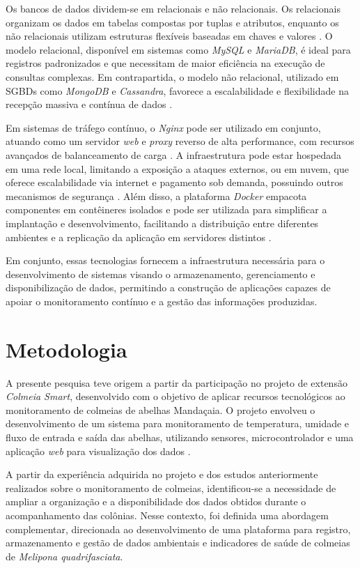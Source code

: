 \documentclass[12pt]{unisenaiclass}
\begin{document}
Os bancos de dados dividem-se em relacionais e não relacionais. Os relacionais organizam os dados em tabelas compostas por tuplas e atributos, enquanto os não relacionais utilizam estruturas flexíveis baseadas em chaves e valores \cite{oliveirabanco2018}. O modelo relacional, disponível em sistemas como \textit{MySQL} e \textit{MariaDB}, é ideal para registros padronizados e que necessitam de maior eficiência na execução de consultas complexas. Em contrapartida, o modelo não relacional, utilizado em SGBDs como \textit{MongoDB} e \textit{Cassandra}, favorece a escalabilidade e flexibilidade na recepção massiva e contínua de dados \cite{garciabanco2019}.

Em sistemas de tráfego contínuo, o \textit{Nginx} pode ser utilizado em conjunto, atuando como um servidor \textit{web} e \textit{proxy} reverso de alta performance, com recursos avançados de balanceamento de carga \cite{santosnginx2024}. A infraestrutura pode estar hospedada em uma rede local, limitando a exposição a ataques externos, ou em nuvem, que oferece escalabilidade via internet e pagamento sob demanda, possuindo outros mecanismos de segurança \cite{souzanuvem2009}. Além disso, a plataforma \textit{Docker} empacota componentes em contêineres isolados e pode ser utilizada para simplificar a implantação e desenvolvimento, facilitando a distribuição entre diferentes ambientes e a replicação da aplicação em servidores distintos \cite{santosnginx2024}.

Em conjunto, essas tecnologias fornecem a infraestrutura necessária para o desenvolvimento de sistemas visando o armazenamento, gerenciamento e disponibilização de dados, permitindo a construção de aplicações capazes de apoiar o monitoramento contínuo e a gestão das informações produzidas.

\section{Metodologia}

A presente pesquisa teve origem a partir da participação no projeto de extensão \textit{Colmeia Smart}, desenvolvido com o objetivo de aplicar recursos tecnológicos ao monitoramento de colmeias de abelhas Mandaçaia. O projeto envolveu o desenvolvimento de um sistema para monitoramento de temperatura, umidade e fluxo de entrada e saída das abelhas, utilizando sensores, microcontrolador e uma aplicação \textit{web} para visualização dos dados \cite{kurfurst2026colmeiasmart}.

A partir da experiência adquirida no projeto e dos estudos anteriormente realizados sobre o monitoramento de colmeias, identificou-se a necessidade de ampliar a organização e a disponibilidade dos dados obtidos durante o acompanhamento das colônias. Nesse contexto, foi definida uma abordagem complementar, direcionada ao desenvolvimento de uma plataforma para registro, armazenamento e gestão de dados ambientais e indicadores de saúde de colmeias de \textit{Melipona quadrifasciata}.
\end{document}
